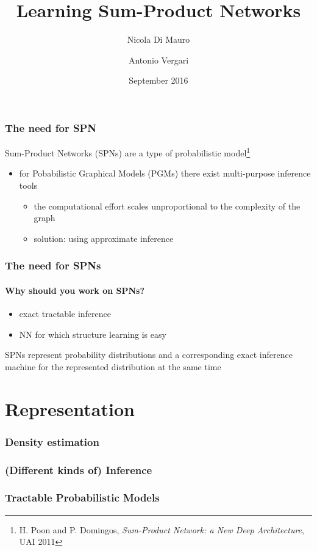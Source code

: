\documentclass[10pt,t]{beamer}
\title{Learning Sum-Product Networks}
\author{Nicola Di Mauro \and Antonio Vergari}
\date{September 2016}
\begin{document}
\begin{frame}
  \titlepage
\end{frame}

\begin{frame}
\frametitle{The need for SPN}
Sum-Product Networks (SPNs) are a type of probabilistic model\footnote{H. Poon
  and P. Domingos, \emph{Sum-Product Network: a New Deep Architecture}, UAI 2011}
\begin{itemize}
\item for Pobabilistic Graphical Models (PGMs) there exist multi-purpose
  inference tools
\begin{itemize}
\item the computational
effort scales unproportional to the complexity of the graph
\item solution: using approximate inference
\end{itemize}
\end{itemize}
\end{frame}

\begin{frame}[t]
  \frametitle{The need for SPNs}
  \framesubtitle{Why should you work on SPNs?}
\begin{itemize}
\item exact tractable inference
  \item NN for which structure learning is easy
\end{itemize}
SPNs represent probability distributions and a corresponding exact inference
machine for the represented distribution at the same time 
\end{frame}

\section{Representation}
{
  \begin{frame}
    \sectionpage
  \end{frame}
}

\begin{frame}
  \frametitle{Density estimation}
\end{frame}

\begin{frame}
  \frametitle{(Different kinds of) Inference}
\end{frame}

\begin{frame}
  \frametitle{Tractable Probabilistic Models}
\end{frame}
\end{document}
